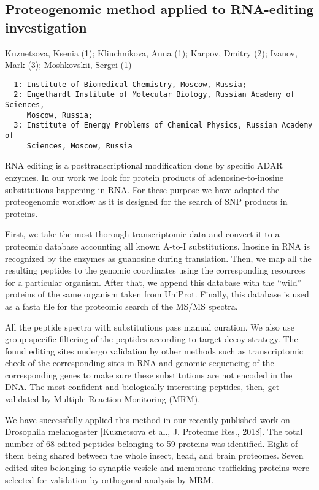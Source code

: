 {\subsection*{\color{eubicRed} Proteogenomic method applied to RNA-editing investigation}
{\color{eubicGray}Kuznetsova, Ksenia (1);
Kliuchnikova, Anna (1);
Karpov, Dmitry (2);
Ivanov, Mark (3);
Moshkovskii, Sergei (1)}
{\color{eubicGray}\begin{verbatim}
  1: Institute of Biomedical Chemistry, Moscow, Russia;
  2: Engelhardt Institute of Molecular Biology, Russian Academy of Sciences,
     Moscow, Russia;
  3: Institute of Energy Problems of Chemical Physics, Russian Academy of
     Sciences, Moscow, Russia
\end{verbatim}}

RNA editing is a posttranscriptional modification done by specific ADAR enzymes. In our work we look for protein products of adenosine-to-inosine substitutions happening in RNA. For these purpose we have adapted the proteogenomic workflow as it is designed for the search of SNP products in proteins.

First, we take the most thorough transcriptomic data and convert it to a proteomic database accounting all known A-to-I substitutions. Inosine in RNA is recognized by the enzymes as guanosine during translation. Then, we map all the resulting peptides to the genomic coordinates using the corresponding resources for a particular organism. After that, we append this database with the “wild” proteins of the same organism taken from UniProt. Finally, this database is used as a fasta file for the proteomic search of the MS/MS spectra.

All the peptide spectra with substitutions pass manual curation. We also use group-specific filtering of the peptides according to target-decoy strategy. The found editing sites undergo validation by other methods such as transcriptomic check of the corresponding sites in RNA and genomic sequencing of the corresponding genes to make sure these substitutions are not encoded in the DNA. The most confident and biologically interesting peptides, then, get validated by Multiple Reaction Monitoring (MRM).

We have successfully applied this method in our recently published work on Drosophila melanogaster [Kuznetsova et al., J. Proteome Res., 2018]. The total number of 68 edited peptides belonging to 59 proteins was identified. Eight of them being shared between the whole insect, head, and brain proteomes. Seven edited sites belonging to synaptic vesicle and membrane trafficking proteins were selected for validation by orthogonal analysis by MRM.

}
